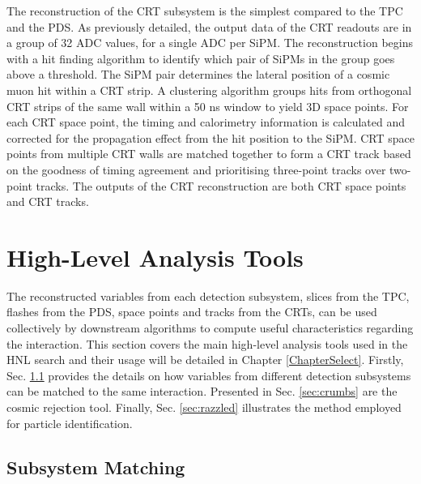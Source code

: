 The reconstruction of the CRT subsystem is the simplest compared to the TPC and the PDS.
As previously detailed, the output data of the CRT readouts are in a group of 32 ADC values, for a single ADC per SiPM.
The reconstruction begins with a hit finding algorithm to identify which pair of SiPMs in the group goes above a threshold.
The SiPM pair determines the lateral position of a cosmic muon hit within a CRT strip.
A clustering algorithm groups hits from orthogonal CRT strips of the same wall within a 50 ns window to yield 3D space points.
For each CRT space point, the timing and calorimetry information is calculated and corrected for the propagation effect from the hit position to the SiPM.
CRT space points from multiple CRT walls are matched together to form a CRT track based on the goodness of timing agreement and prioritising three-point tracks over two-point tracks.
The outputs of the CRT reconstruction are both CRT space points and CRT tracks. 

\section{High-Level Analysis Tools}
\label{sec:reco_ana_tools}

The reconstructed variables from each detection subsystem, slices from the TPC, flashes from the PDS, space points and tracks from the CRTs, can be used collectively by downstream algorithms to compute useful characteristics regarding the interaction.
This section covers the main high-level analysis tools used in the HNL search and their usage will be detailed in Chapter \ref{ChapterSelect}.
Firstly, Sec. \ref{sec:subsystem_match} provides the details on how variables from different detection subsystems can be matched to the same interaction.
Presented in Sec. \ref{sec:crumbs} are the cosmic rejection tool.
Finally, Sec. \ref{sec:razzled} illustrates the method employed for particle identification.

\subsection{Subsystem Matching}
\label{sec:subsystem_match}

